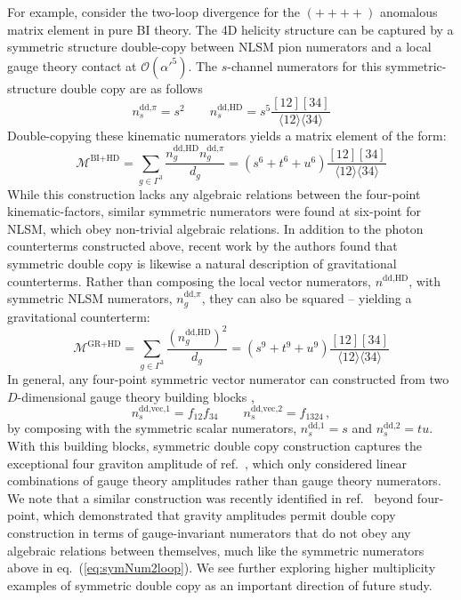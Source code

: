 \documentclass[11pt,letter]{article}
\def\eqn#1{eq.~(\ref{#1})}
\begin{document}
For example, consider the two-loop divergence for the $(++++)$ anomalous matrix element in pure BI theory. The 4D helicity structure can be captured by a symmetric structure double-copy between NLSM pion numerators and a local gauge theory contact at $\mathcal{O}(\alpha'^5)$. The $s$-channel numerators for this symmetric-structure double copy are as follows
\begin{equation}\label{eq:symNum2loop}
n_s^{\text{dd,}\pi} = s^2 \qquad n_s^{\text{dd,HD}} = s^5 \frac{[12][34]}{\langle 12\rangle \langle 34\rangle}
\end{equation}
Double-copying these kinematic numerators yields a matrix element of the form:
\begin{equation} \label{eq:2loopCTsymDC}
\mathcal{M}^{\text{BI}+\text{HD}} = \sum_{g\in \Gamma^3} \frac{n_g^{\text{dd,HD}}n^{\text{dd,}\pi}_g}{d_g} = (s^6+t^6+u^6) \frac{[12][34]}{\langle 12\rangle \langle 34\rangle}
\end{equation}
While this construction lacks any algebraic relations between the four-point kinematic-factors, similar symmetric numerators were found at six-point for NLSM, which obey non-trivial algebraic relations. In addition to the photon counterterms constructed above, recent work by the authors \cite{Carrasco:2022jxn} found that symmetric double copy is likewise a natural description of gravitational counterterms. Rather than composing the local vector numerators, $n^{\text{dd,HD}}$, with symmetric NLSM numerators, $n^{\text{dd,}\pi}_g$, they can also be squared -- yielding a gravitational counterterm:
\begin{equation} \label{eq:2loopCTsymDC}
\mathcal{M}^{\text{GR}+\text{HD}} = \sum_{g\in \Gamma^3} \frac{(n^{\text{dd,HD}}_g)^2}{d_g} = (s^9+t^9+u^9)  \frac{[12][34]}{\langle 12\rangle \langle 34\rangle}
\end{equation}
In general, any four-point symmetric vector numerator can constructed from two $D$-dimensional gauge theory building blocks \cite{Carrasco:2022jxn},
\begin{equation}
n_s^{\text{dd,vec,1}} = f_{12}f_{34} \qquad n_s^{\text{dd,vec,2}} = f_{1324}\,,
\end{equation}
by composing with the symmetric scalar numerators, $n_s^{\text{dd,1}} = s$ and  $n_s^{\text{dd,2}} = tu$. With this building blocks, symmetric double copy construction captures the exceptional four graviton amplitude of ref.~\cite{Boels:2016xhc}, which only considered linear combinations of gauge theory amplitudes rather than gauge theory numerators. We note that a similar construction was recently identified in ref.~\cite{Bourjaily:2023tcc} beyond four-point, which demonstrated that gravity amplitudes permit double copy construction in terms of gauge-invariant numerators that do not obey any algebraic relations between themselves, much like the symmetric numerators above in \eqn{eq:symNum2loop}. We see further exploring higher multiplicity examples of symmetric double copy as an important direction of future study. 
\end{document}
